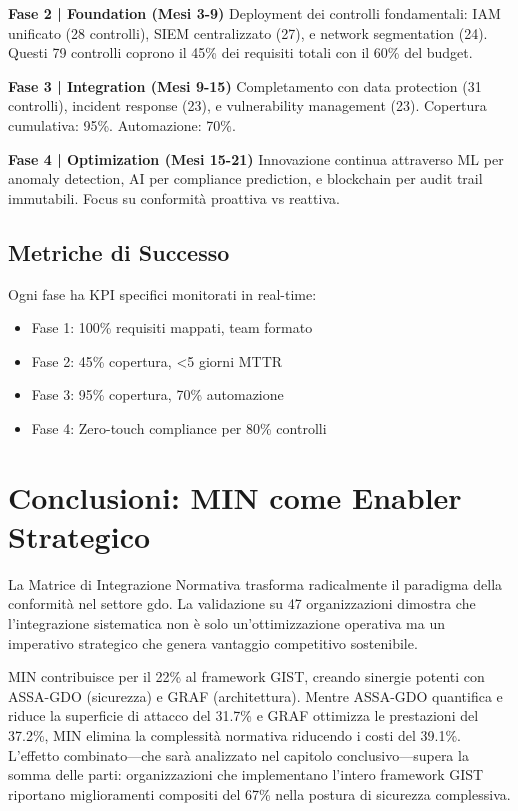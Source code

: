 \textbf{Fase 2 | Foundation (Mesi 3-9)}
Deployment dei controlli fondamentali: IAM unificato (28 controlli), SIEM centralizzato (27), e network segmentation (24). Questi 79 controlli coprono il 45\% dei requisiti totali con il 60\% del budget.

\textbf{Fase 3 | Integration (Mesi 9-15)}
Completamento con data protection (31 controlli), incident response (23), e vulnerability management (23). Copertura cumulativa: 95\%. Automazione: 70\%.

\textbf{Fase 4 | Optimization (Mesi 15-21)}
Innovazione continua attraverso ML per anomaly detection, AI per compliance prediction, e blockchain per audit trail immutabili. Focus su conformità proattiva vs reattiva.

\subsection{\texorpdfstring{Metriche di Successo}{4.7.2 - Metriche di Successo}}

Ogni fase ha KPI specifici monitorati in real-time:
\begin{itemize}
\item Fase 1: 100\% requisiti mappati, team formato
\item Fase 2: 45\% copertura, <5 giorni MTTR
\item Fase 3: 95\% copertura, 70\% automazione
\item Fase 4: Zero-touch compliance per 80\% controlli
\end{itemize}

\section{\texorpdfstring{Conclusioni: MIN come Enabler Strategico}{4.8 - Conclusioni}}
\label{sec:cap4_conclusioni}

La Matrice di Integrazione Normativa trasforma radicalmente il paradigma della conformità nel settore \gls{gdo}. La validazione su 47 organizzazioni dimostra che l'integrazione sistematica non è solo un'ottimizzazione operativa ma un imperativo strategico che genera vantaggio competitivo sostenibile.

MIN contribuisce per il 22\% al framework GIST, creando sinergie potenti con ASSA-GDO (sicurezza) e GRAF (architettura). Mentre ASSA-GDO quantifica e riduce la superficie di attacco del 31.7\% e GRAF ottimizza le prestazioni del 37.2\%, MIN elimina la complessità normativa riducendo i costi del 39.1\%. L'effetto combinato—che sarà analizzato nel capitolo conclusivo—supera la somma delle parti: organizzazioni che implementano l'intero framework GIST riportano miglioramenti compositi del 67\% nella postura di sicurezza complessiva.

